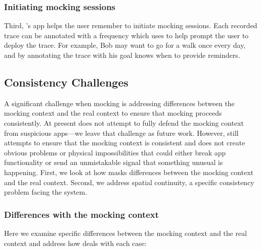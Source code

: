 \subsubsection{Initiating mocking sessions}

Third, \PocketMocker{}'s app helps the user remember to initiate mocking
sessions. Each recorded trace can be annotated with a frequency which
\PocketMocker{} uses to help prompt the user to deploy the trace. For
example, Bob may want to go for a walk once every day, and by annotating the
trace with his goal \PocketMocker{} knows when to provide reminders.

\subsection{Consistency Challenges}

A significant challenge when mocking is addressing differences between the
mocking context and the real context to ensure that mocking proceeds
consistently. At present \PocketMocker{} does not attempt to fully defend the
mocking context from suspicious apps---we leave that challenge as future
work. However, \PocketMocker{} still attempts to ensure that the mocking
context is consistent and does not create obvious problems or physical
impossibilities that could either break app functionality or send an
unmistakable signal that something unusual is happening. First, we look at
how \PocketMocker{} masks differences between the mocking context and the
real context. Second, we address spatial continuity, a specific consistency
problem facing the \PocketMocker{} system.

\subsubsection{Differences with the mocking context}

Here we examine specific differences between the mocking context and the real
context and address how \PocketMocker{} deals with each case:

